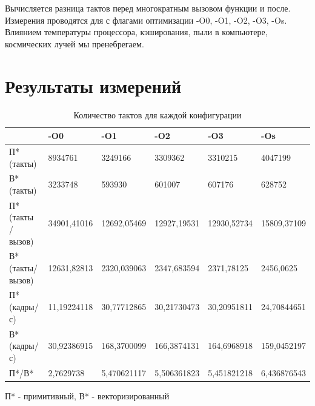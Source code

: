 \documentclass[a4paper, 12pt]{article}
\begin{document}
Вычисляется разница тактов перед многократным вызовом функции и после.\\

Измерения проводятся для с флагами оптимизации -O0, -O1, -O2, -O3, -Os.\\

Влиянием температуры процессора, кэширования, пыли в компьютере, космических лучей мы пренебрегаем.

\section*{Результаты измерений}
\begin{table}[h]
    \centering
    \begin{tabular}{|l|l|l|l|l|l|}
    \hline
        ~ & -O0 & -O1 & -O2 & -O3 & -Os \\ \hline
        П* (такты) & 8934761 & 3249166 & 3309362 & 3310215 & 4047199 \\ \hline
        В* (такты) & 3233748 & 593930 & 601007 & 607176 & 628752 \\ \hline
        П* (такты / вызов) & 34901,41016 & 12692,05469 & 12927,19531 & 12930,52734 & 15809,37109 \\ \hline
        В* (такты/вызов) & 12631,82813 & 2320,039063 & 2347,683594 & 2371,78125 & 2456,0625 \\ \hline
        П* (кадры/с)  & 11,19224118 & 30,77712865 & 30,21730473 & 30,20951811 & 24,70844651 \\ \hline
        В* (кадры/с) & 30,92386915 & 168,3700099 & 166,3874131 & 164,6968918 & 159,0452197 \\ \hline
        П*/В* & 2,7629738 & 5,470621117 & 5,506361823 & 5,451821218 & 6,436876543 \\ \hline
        
    \end{tabular}
    \caption{Количество тактов для каждой конфигурации}
\end{table}
\centering П* - примитивный, В* - векторизированный
\end{document}
